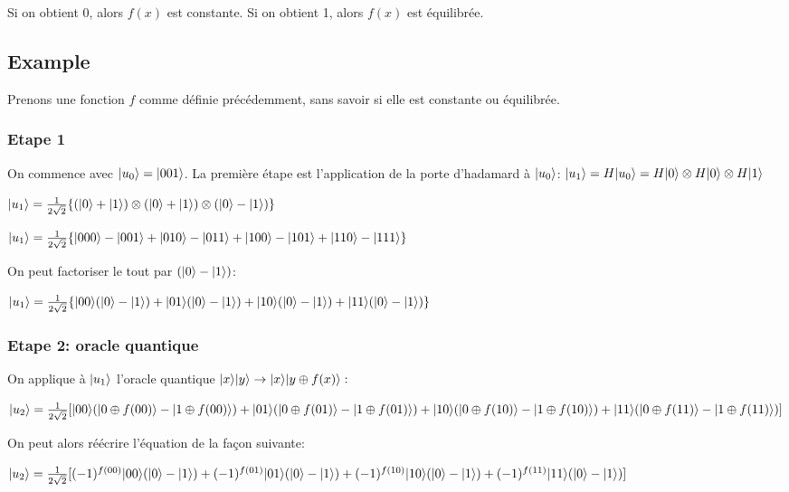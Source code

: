 \documentclass[12pt,a4paper]{article}
\DeclarePairedDelimiter\ket{\lvert}{\rangle}
\begin{document}
Si on obtient 0, alors $f(x)$ est constante. Si on obtient 1, alors $f(x)$ est équilibrée.


\subsection{Example}

Prenons une fonction $f$ comme définie précédemment, sans savoir si elle est constante ou équilibrée.

\subsubsection{Etape 1}

On commence avec $\ket{u_0} = \ket{001}$. La première étape est l'application de la porte d'hadamard à $\ket{u_0}$: 
\medbreak
$
\ket{u_1} = H\ket{u_0} = H\ket{0} \otimes H\ket{0} \otimes H\ket{1}
$

$
\ket{u_1} = \frac{1}{2\sqrt{2}}\{ (\ket{0} + \ket{1})\otimes(\ket{0} + \ket{1})\otimes(\ket{0} - \ket{1}) \}
$

$
\ket{u_1} = \frac{1}{2\sqrt{2}}\{\ket{000} - \ket{001} + \ket{010} - \ket{011} + \ket{100} - \ket{101} + \ket{110} - \ket{111}\}
$

On peut factoriser le tout par $(\ket{0} - \ket{1})$: 

$
\ket{u_1} = \frac{1}{2\sqrt{2}}\{\ket{00}(\ket{0} - \ket{1}) + \ket{01}(\ket{0} - \ket{1}) + \ket{10}(\ket{0} - \ket{1}) + \ket{11}(\ket{0} - \ket{1})\}
$

\subsubsection{Etape 2: oracle quantique}

On applique à $\ket{u_1}$ l'oracle quantique $\ket{x}\ket{y}\rightarrow\ket{x}\ket{y\oplus f(x)}:$

$
\ket{u_2} = \frac{1}{2\sqrt{2}}[ \\ 
\ket{00}(\ket{0 \oplus f(00)} - \ket{1 \oplus f(00)}) + \\
\ket{01}(\ket{0 \oplus f(01)} - \ket{1 \oplus f(01)}) + \\
\ket{10}(\ket{0 \oplus f(10)} - \ket{1 \oplus f(10)}) + \\
\ket{11}(\ket{0 \oplus f(11)} - \ket{1 \oplus f(11)})]
$

\medbreak
On peut alors réécrire l'équation de la façon suivante: 

$
\ket{u_2} = \frac{1}{2\sqrt{2}}[ \\
(-1)^{f(00)} \ket{00}  (\ket{0} - \ket{1}) + \\
(-1)^{f(01)} \ket{01}  (\ket{0} - \ket{1}) + \\
(-1)^{f(10)} \ket{10}  (\ket{0} - \ket{1}) + \\
(-1)^{f(11)} \ket{11}  (\ket{0} - \ket{1}) ]
$
\end{document}
